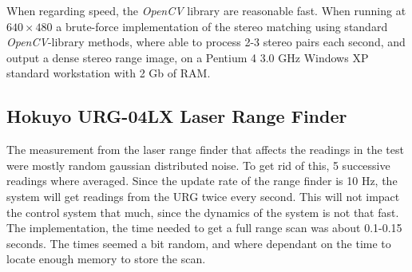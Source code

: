 When regarding speed, the \emph{OpenCV} library are reasonable fast. When running at
$640\times480$ a brute-force implementation of the stereo matching using standard
\emph{OpenCV}-library methods, where able to process 2-3 stereo pairs each second, and
output a dense stereo range image, on a Pentium 4 3.0 GHz Windows XP standard workstation
with 2 Gb of RAM. 



\subsection{Hokuyo URG-04LX Laser Range Finder}
The measurement from the laser range finder that affects the readings in the test were
mostly random gaussian distributed noise. To get rid of this, 5 successive
readings where averaged. Since the update rate of the range finder is 10 Hz, the system
will get readings from the URG twice every second. This will not impact the control system
that much, since the dynamics of the system is not that fast. The implementation, the time
needed to get a full range scan was about 0.1-0.15 seconds. The times seemed a bit random,
and where dependant on the time to locate enough memory to store the scan. 



